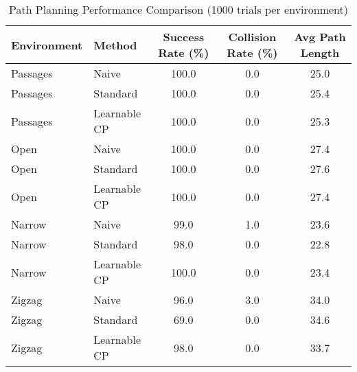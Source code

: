 
\begin{table}[htbp]
\centering
\caption{Path Planning Performance Comparison (1000 trials per environment)}
\label{tab:results}
\begin{tabular}{llccc}
\toprule
Environment & Method & Success Rate (\%) & Collision Rate (\%) & Avg Path Length \\
\midrule
Passages & Naive & 100.0 & 0.0 & 25.0 \\
Passages & Standard & 100.0 & 0.0 & 25.4 \\
Passages & Learnable CP & 100.0 & 0.0 & 25.3 \\
\midrule
Open & Naive & 100.0 & 0.0 & 27.4 \\
Open & Standard & 100.0 & 0.0 & 27.6 \\
Open & Learnable CP & 100.0 & 0.0 & 27.4 \\
\midrule
Narrow & Naive & 99.0 & 1.0 & 23.6 \\
Narrow & Standard & 98.0 & 0.0 & 22.8 \\
Narrow & Learnable CP & 100.0 & 0.0 & 23.4 \\
\midrule
Zigzag & Naive & 96.0 & 3.0 & 34.0 \\
Zigzag & Standard & 69.0 & 0.0 & 34.6 \\
Zigzag & Learnable CP & 98.0 & 0.0 & 33.7 \\
\midrule

\bottomrule
\end{tabular}
\end{table}
